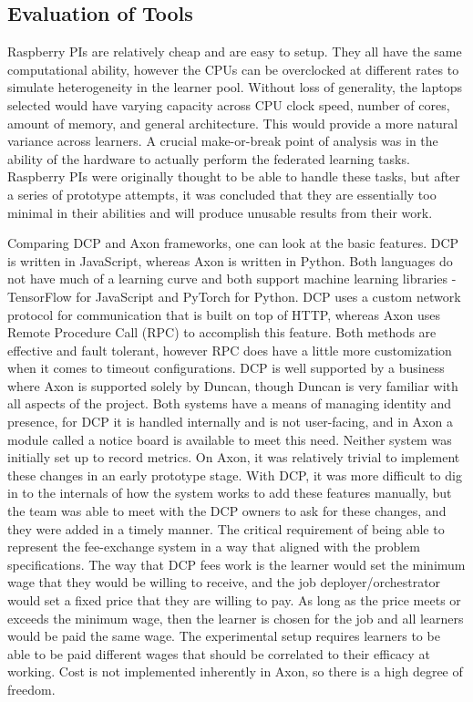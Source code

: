 \documentclass[../mthe-493-final-project.tex]{subfiles}
\begin{document}
    \subsection{Evaluation of Tools}
    Raspberry PIs are relatively cheap and are easy to setup. They all have the same computational ability, however the CPUs can be overclocked at different rates to simulate heterogeneity in the learner pool. Without loss of generality, the laptops selected would have varying capacity across CPU clock speed, number of cores, amount of memory, and general architecture. This would provide a more natural variance across learners. A crucial make-or-break point of analysis was in the ability of the hardware to actually perform the federated learning tasks. Raspberry PIs were originally thought to be able to handle these tasks, but after a series of prototype attempts, it was concluded that they are essentially too minimal in their abilities and will produce unusable results from their work. 
    
    Comparing DCP and Axon frameworks, one can look at the basic features. DCP is written in JavaScript, whereas Axon is written in Python. Both languages do not have much of a learning curve and both support machine learning libraries - TensorFlow for JavaScript and PyTorch for Python. DCP uses a custom network protocol for communication that is built on top of HTTP, whereas Axon uses Remote Procedure Call (RPC) to accomplish this feature. Both methods are effective and fault tolerant, however RPC does have a little more customization when it comes to timeout configurations. DCP is well supported by a business where Axon is supported solely by Duncan, though Duncan is very familiar with all aspects of the project. Both systems have a means of managing identity and presence, for DCP it is handled internally and is not user-facing, and in Axon a module called a notice board is available to meet this need. Neither system was initially set up to record metrics. On Axon, it was relatively trivial to implement these changes in an early prototype stage. With DCP, it was more difficult to dig in to the internals of how the system works to add these features manually, but the team was able to meet with the DCP owners to ask for these changes, and they were added in a timely manner. The critical requirement of being able to represent the fee-exchange system in a way that aligned with the problem specifications. The way that DCP fees work is the learner would set the minimum wage that they would be willing to receive, and the job deployer/orchestrator would set a fixed price that they are willing to pay. As long as the price meets or exceeds the minimum wage, then the learner is chosen for the job and all learners would be paid the same wage. The experimental setup requires learners to be able to be paid different wages that should be correlated to their efficacy at working. Cost is not implemented inherently in Axon, so there is a high degree of freedom. 
    
\end{document}
